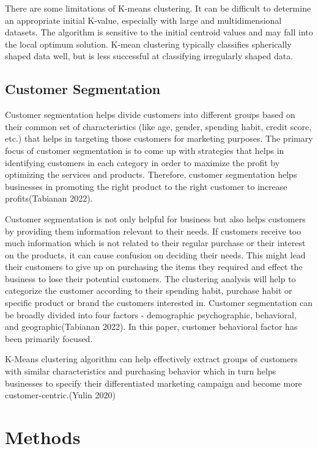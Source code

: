 \documentclass[
]{article}
\begin{document}
There are some limitations of K-means clustering. It can be difficult to
determine an appropriate initial K-value, especially with large and
multidimensional datasets. The algorithm is sensitive to the initial
centroid values and may fall into the local optimum solution. K-mean
clustering typically classifies spherically shaped data well, but is
less successful at classifying irregularly shaped data.

\hypertarget{customer-segmentation}{%
\subsection{Customer Segmentation}\label{customer-segmentation}}

Customer segmentation helps divide customers into different groups based
on their common set of characteristics (like age, gender, spending
habit, credit score, etc.) that helps in targeting those customers for
marketing purposes. The primary focus of customer segmentation is to
come up with strategies that helps in identifying customers in each
category in order to maximize the profit by optimizing the services and
products. Therefore, customer segmentation helps businesses in promoting
the right product to the right customer to increase profits(Tabianan
2022).

Customer segmentation is not only helpful for business but also helps
customers by providing them information relevant to their needs. If
customers receive too much information which is not related to their
regular purchase or their interest on the products, it can cause
confusion on deciding their needs. This might lead their customers to
give up on purchasing the items they required and effect the business to
lose their potential customers. The clustering analysis will help to
categorize the customer according to their spending habit, purchase
habit or specific product or brand the customers interested in. Customer
segmentation can be broadly divided into four factors - demographic
psychographic, behavioral, and geographic(Tabianan 2022). In this paper,
customer behavioral factor has been primarily focused.

K-Means clustering algorithm can help effectively extract groups of
customers with similar characteristics and purchasing behavior which in
turn helps businesses to specify their differentiated marketing campaign
and become more customer-centric.(Yulin 2020)

\hypertarget{methods}{%
\section{Methods}\label{methods}}
\end{document}
